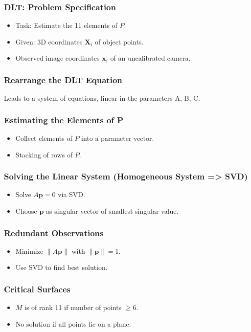 \begin{frame}
  \frametitle{DLT: Problem Specification}
  \begin{itemize}
    \item Task: Estimate the 11 elements of $P$.
    \item Given: 3D coordinates $\mathbf{X}_i$ of object points.
    \item Observed image coordinates $\mathbf{x}_i$ of an uncalibrated camera.
  \end{itemize}
\end{frame}

\begin{frame}
  \frametitle{Rearrange the DLT Equation}
  Leads to a system of equations, linear in the parameters A, B, C.
\end{frame}

\begin{frame}
  \frametitle{Estimating the Elements of P}
  \begin{itemize}
    \item Collect elements of $P$ into a parameter vector.
    \item Stacking of rows of $P$.
  \end{itemize}
\end{frame}

\begin{frame}
  \frametitle{Solving the Linear System (Homogeneous System => SVD)}
  \begin{itemize}
    \item Solve $A\mathbf{p}=0$ via SVD.
    \item Choose $\mathbf{p}$ as singular vector of smallest singular value.
  \end{itemize}
\end{frame}

\begin{frame}
  \frametitle{Redundant Observations}
  \begin{itemize}
    \item Minimize $\|A\mathbf{p}\|$ with $\|\mathbf{p}\|=1$.
    \item Use SVD to find best solution.
  \end{itemize}
\end{frame}

\begin{frame}
  \frametitle{Critical Surfaces}
  \begin{itemize}
    \item $M$ is of rank 11 if number of points $\ge 6$.
    \item No solution if all points lie on a plane.
  \end{itemize}
\end{frame}

